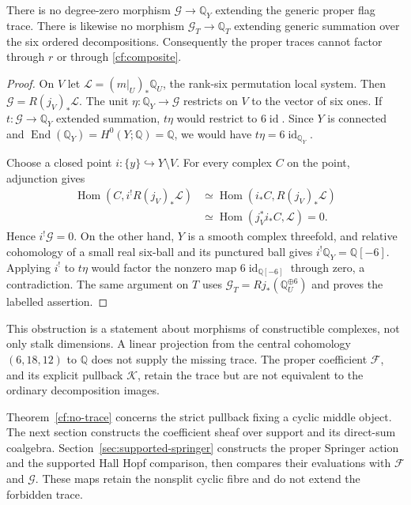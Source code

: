 \begin{theorem}\label{cf:no-trace}
There is no degree-zero morphism $\mathcal G\to\mathbb Q_Y$
extending the generic proper flag trace. There is likewise no
morphism $\mathcal G_T\to\mathbb Q_T$ extending generic summation
over the six ordered decompositions. Consequently the proper traces
cannot factor through $r$ or through \eqref{cf:composite}.
\end{theorem}
\begin{proof}
On $V$ let $\mathcal L=(m|_U)_*\mathbb Q_U$, the rank-six
permutation local system. Then
$\mathcal G=R(j_V)_*\mathcal L$.
The unit $\eta:\mathbb Q_Y\to\mathcal G$ restricts on $V$ to
the vector of six ones. If $t:\mathcal G\to\mathbb Q_Y$
extended summation, $t\eta$ would restrict to $6\operatorname{id}$.
Since $Y$ is connected and
$\operatorname{End}(\mathbb Q_Y)=H^0(Y;\mathbb Q)=\mathbb Q$,
we would have $t\eta=6\operatorname{id}_{\mathbb Q_Y}$.

Choose a closed point $i:\{y\}\hookrightarrow Y\setminus V$.
For every complex $C$ on the point, adjunction gives
\[
 \begin{split}
 \operatorname{Hom}(C,i^!R(j_V)_*\mathcal L)
 &\simeq\operatorname{Hom}(i_*C,R(j_V)_*\mathcal L)\\
 &\simeq\operatorname{Hom}(j_V^*i_*C,\mathcal L)=0.
 \end{split}
\]
Hence $i^!\mathcal G=0$. On the other hand, $Y$ is a smooth
complex threefold, and relative cohomology of a small real six-ball
and its punctured ball gives $i^!\mathbb Q_Y=\mathbb Q[-6]$.
Applying $i^!$ to $t\eta$ would factor the nonzero map
$6\operatorname{id}_{\mathbb Q[-6]}$ through zero, a contradiction.
The same argument on $T$ uses
$\mathcal G_T=Rj_*(\mathbb Q_U^{\oplus6})$ and proves the
labelled assertion.
\end{proof}

This obstruction is a statement about morphisms of constructible
complexes, not only stalk dimensions. A linear projection from the
central cohomology $(6,18,12)$ to $\mathbb Q$ does not supply the
missing trace. The proper coefficient $\mathcal F$, and its explicit
pullback $\mathcal K$, retain the trace but are not equivalent to
the ordinary decomposition images.

Theorem~\ref{cf:no-trace} concerns the strict pullback fixing a
cyclic middle object. The next section constructs the coefficient
sheaf over support and its direct-sum coalgebra.
Section~\ref{sec:supported-springer} constructs the proper
Springer action and the supported Hall Hopf comparison, then
compares their evaluations with $\mathcal F$ and $\mathcal G$.
These maps retain the nonsplit cyclic fibre and do not extend
the forbidden trace.
